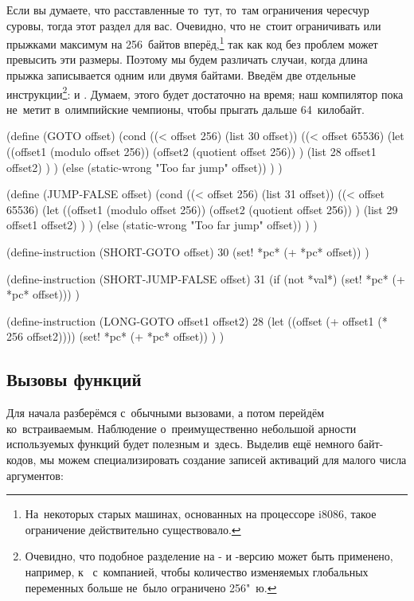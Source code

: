 Если вы думаете, что расставленные то~тут, то~там ограничения чересчур суровы,
тогда этот раздел для вас. Очевидно, что не~стоит ограничивать  или
 прыжками максимум на 256~байтов вперёд,\footnote*{На~некоторых
старых машинах, основанных на процессоре i8086, такое ограничение действительно
существовало.} так как код без проблем может превысить эти размеры. Поэтому мы
будем различать случаи, когда длина прыжка записывается одним или двумя байтами.
Введём две отдельные инструкции\footnote{Очевидно, что подобное разделение на
- и -версию может быть применено, например, к~
с~компанией, чтобы количество изменяемых глобальных переменных больше не~было
ограничено 256"~ю.}:  и . Думаем, этого будет
достаточно на время; наш компилятор пока не~метит в~олимпийские чемпионы, чтобы
прыгать дальше 64~килобайт.

\begin{code:lisp}
(define (GOTO offset)
  (cond ((< offset 256) (list 30 offset))
        ((< offset 65536)
         (let ((offset1 (modulo offset 256))
               (offset2 (quotient offset 256)) )
           (list 28 offset1 offset2) ) )
        (else (static-wrong "Too far jump" offset)) ) )

(define (JUMP-FALSE offset)
  (cond ((< offset 256) (list 31 offset))
        ((< offset 65536)
         (let ((offset1 (modulo offset 256))
               (offset2 (quotient offset 256)) )
           (list 29 offset1 offset2) ) )
        (else (static-wrong "Too far jump" offset)) ) )

(define-instruction (SHORT-GOTO offset) 30
  (set! *pc* (+ *pc* offset)) )

(define-instruction (SHORT-JUMP-FALSE offset) 31
  (if (not *val*) (set! *pc* (+ *pc* offset))) )

(define-instruction (LONG-GOTO offset1 offset2) 28
  (let ((offset (+ offset1 (* 256 offset2))))
    (set! *pc* (+ *pc* offset)) ) )
\end{code:lisp}


\subsection{Вызовы функций}\label{compilation/instruction/ssect:invocations}

Для начала разберёмся с~обычными вызовами, а потом перейдём ко~встраиваемым.
Наблюдение о~преимущественно небольшой арности используемых функций будет
полезным и~здесь. Выделив ещё немного байт-кодов, мы можем специализировать
создание записей активаций для малого числа аргументов:

